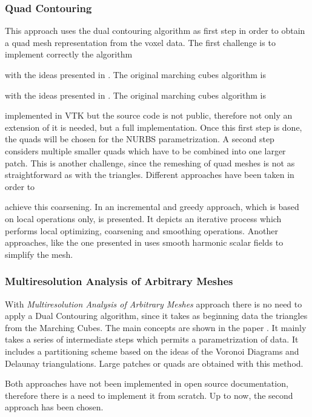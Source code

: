 \subsubsection{Quad Contouring}
This approach uses the dual contouring algorithm as first step in order to obtain a quad mesh
representation from the voxel data. The first challenge is to implement correctly the algorithm

with the ideas presented in \cite{Hermite2002}. The original marching cubes algorithm is

with the ideas presented in \cite{Hermite2002}. The original marching cubes algorithm is

implemented in VTK but the source code is not public, therefore not only an extension
of it is needed, but a full implementation. Once this first step is done, the quads will be chosen for the
NURBS parametrization. A second step considers multiple smaller quads which have to be
combined into one larger patch. This is another challenge, since the remeshing of quad meshes
is not as straightforward as with the triangles. Different approaches have been taken in order to

achieve this coarsening. In \cite{Puppo2010} an incremental and greedy approach, which is based on local operations only, is presented. It depicts an iterative process which performs local optimizing, coarsening and smoothing operations. Another approaches, like
the one presented in \cite{Dong2005} uses smooth harmonic scalar fields to simplify the mesh.



\subsubsection{Multiresolution Analysis of Arbitrary Meshes}
With \textit{Multiresolution Analysis of Arbitrary Meshes} approach there is no need to apply a Dual Contouring algorithm, since it takes as
beginning data the triangles from the Marching Cubes. The main concepts are shown in the paper \cite{eck1996automatic}. It mainly takes a series of intermediate steps which permits a parametrization of data. It includes a partitioning scheme based on the ideas of the Voronoi Diagrams and Delaunay triangulations. Large patches or quads are obtained with this method. 


Both approaches have not been implemented in open source documentation, therefore there is a need to implement it from scratch. Up to now, the second approach has been chosen.

